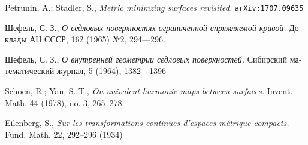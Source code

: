 \documentclass{article}
\begin{document}
\begin{thebibliography}{52}
 Petrunin, A.; Stadler, S., 
\textit{Metric minimzing surfaces revisited.} \texttt{arXiv:1707.09635}

\begin{otherlanguage}{russian}
Шефель, С. З.,
\textit{О седловых поверхностях ограниченной спрямляемой кривой.}
Доклады АН СССР, 162 (1965) №2, 
294---296.
\end{otherlanguage}

\begin{otherlanguage}{russian}
Шефель, С. З., 
\textit{О внутренней геометрии седловых поверхностей.}
Сибирский математический журнал, 5 (1964), 1382---1396
\end{otherlanguage}

 Schoen, R.; Yau, S.-T.,
\textit{On univalent harmonic maps between surfaces.}
Invent. Math. 44 (1978), no. 3, 265--278. 

 Eilenberg, S.,
\textit{Sur les transformations continues d’espaces m\'{e}trique compacts.}
Fund. Math. 22, 292--296 (1934)

\end{thebibliography}

\Addresses
\end{document}
